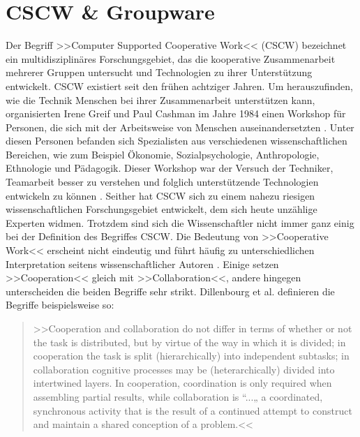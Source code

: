 \chapter{CSCW \& Groupware}\label{ch:CSCWDesign}

	Der Begriff >>Computer Supported Cooperative Work<< (CSCW) bezeichnet ein multidisziplinäres Forschungsgebiet, das die kooperative Zusammenarbeit mehrerer Gruppen untersucht und Technologien zu ihrer Unterstützung entwickelt. CSCW existiert seit den frühen achtziger Jahren. Um herauszufinden, wie die Technik Menschen bei ihrer Zusammenarbeit unterstützen kann, organisierten Irene Greif und Paul Cashman im Jahre 1984 einen Workshop für Personen, die sich mit der Arbeitsweise von Menschen auseinandersetzten \citep{Grudin:1994}. Unter diesen Personen befanden sich Spezialisten aus verschiedenen wissenschaftlichen Bereichen, wie zum Beispiel Ökonomie, Sozialpsychologie, Anthropologie, Ethnologie und Pädagogik. Dieser Workshop war der Versuch der Techniker, Teamarbeit besser zu verstehen und folglich unterstützende Technologien entwickeln zu können \citep{Grudin:1994, Rama:2006p245}. Seither hat CSCW sich zu einem nahezu riesigen wissenschaftlichen Forschungsgebiet entwickelt, dem sich heute unzählige Experten widmen. Trotzdem sind sich die Wissenschaftler nicht immer ganz einig bei der Definition des Begriffes CSCW. Die Bedeutung von >>Cooperative Work<< erscheint nicht eindeutig und führt häufig zu unterschiedlichen Interpretation seitens wissenschaftlicher Autoren \citep{Gerlicher:2007p241}. Einige setzen >>Cooperation<< gleich mit >>Collaboration<<, andere hingegen unterscheiden die beiden Begriffe sehr strikt. Dillenbourg et al. definieren die Begriffe beispielsweise so: 
	
	\medskip\begin{quote}{>>Cooperation and collaboration do not differ in terms of whether or not the task is distributed, but by virtue of the way in which it is divided; in cooperation the task is split (hierarchically) into independent subtasks; in collaboration cognitive processes may be (heterarchically) divided into intertwined layers. In cooperation, coordination is only required when assembling partial results, while collaboration is “...„ a coordinated, synchronous activity that is the result of a continued attempt to construct and maintain a shared conception of a problem.<<} \begin{flushright}\citep{Dillenbourg:1995} \end{flushright}\end{quote}
	
